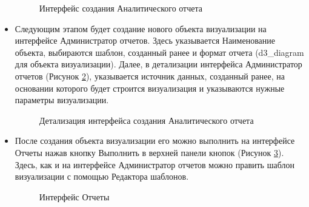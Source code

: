 \documentclass[a4paper]{extarticle}
\numberwithin{equation}{section}
\begin{document}
\begin{itemize}
\begin{figure}[H]
\caption{Интерфейс создания Аналитического отчета}
\label{ris4_1}
\end{figure}\par
    \item Следующим этапом будет создание нового объекта визуализации на интерфейсе Администратор отчетов. Здесь указывается Наименование объекта, выбираются шаблон, созданный ранее и формат отчета (d3\_diagram для объекта визуализации). Далее, в детализации интерфейса Администратор отчетов (Рисунок \ref{ris4_2}), указывается источник данных, созданный ранее, на основании которого будет строится визуализация и указываются нужные параметры визуализации.
\begin{figure}[H]
\caption{Детализация интерфейса создания Аналитического отчета}
\label{ris4_2}
\end{figure}\par
    \item После создания объекта визуализации его можно выполнить на интерфейсе Отчеты нажав кнопку Выполнить в верхней панели кнопок (Рисунок \ref{ris6}). Здесь, как и на интерфейсе Администратор отчетов можно править шаблон визуализации с помощью Редактора шаблонов.
\begin{figure}[H]
\caption{Интерфейс Отчеты}
\label{ris6}
\end{figure}\par
\end{itemize}\par
\end{document}
